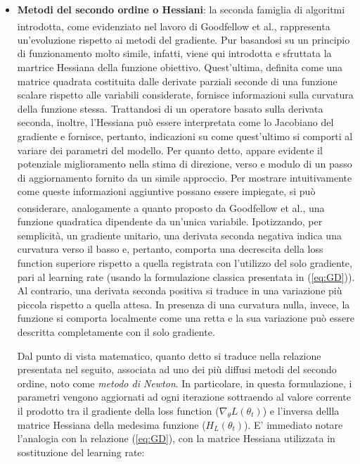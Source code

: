 \begin{itemize}
        \item \textbf{Metodi del secondo ordine o Hessiani}: la seconda famiglia di algoritmi introdotta, come evidenziato nel lavoro di Goodfellow et al.\textsuperscript{\parencite[Sez.~4.3.1]{Goodfellow}}, rappresenta un'evoluzione rispetto ai metodi del gradiente. Pur basandosi su un principio di funzionamento molto simile, infatti, viene qui introdotta e sfruttata la martrice Hessiana della funzione obiettivo. Quest'ultima, definita come una matrice quadrata costituita dalle derivate parziali seconde di una funzione scalare rispetto alle variabili considerate, fornisce informazioni sulla curvatura della funzione stessa. Trattandosi di un operatore basato sulla derivata seconda, inoltre, l'Hessiana può essere interpretata come lo Jacobiano del gradiente e fornisce, pertanto, indicazioni su come quest'ultimo si comporti al variare dei parametri del modello. Per quanto detto, appare evidente il potenziale miglioramento nella stima di direzione, verso e modulo di un passo di aggiornamento fornito da un simile approccio. Per mostrare intuitivamente come queste informazioni aggiuntive possano essere impiegate, si può considerare, analogamente a quanto proposto da Goodfellow et al.\textsuperscript{\parencite[Sez.~4.3.1, pp 84-85]{Goodfellow}}, una funzione quadratica dipendente da un'unica variabile. Ipotizzando, per semplicità, un gradiente unitario, una derivata seconda negativa indica una curvatura verso il basso e, pertanto, comporta una decrescita della loss function superiore rispetto a quella registrata con l'utilizzo del solo gradiente, pari al learning rate (usando la formulazione classica presentata in (\ref{eq:GD})). Al contrario, una derivata seconda positiva si traduce in una variazione più piccola rispetto a quella attesa. In presenza di una curvatura nulla, invece, la funzione si comporta localmente come una retta e la sua variazione può essere descritta completamente con il solo gradiente. 
        
        Dal punto di vista matematico, quanto detto si traduce nella relazione presentata nel seguito, associata ad uno dei più diffusi metodi del secondo ordine, noto come \emph{metodo di Newton}. In particolare, in questa formulazione, i parametri vengono aggiornati ad ogni iterazione sottraendo al valore corrente il prodotto tra il gradiente della loss function ($\nabla_{\theta} L(\theta_{t})$) e l'inversa dellla matrice Hessiana della medesima funzione ($H_{L}(\theta_{t})$). E' immediato notare l'analogia con la relazione (\ref{eq:GD}), con la matrice Hessiana utilizzata in sostituzione del learning rate:
        

\end{itemize}
